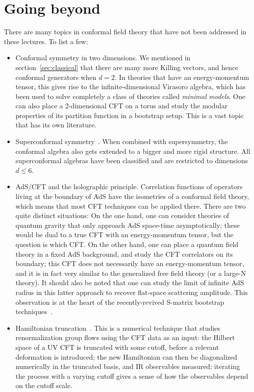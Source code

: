 \documentclass[a4paper,12pt]{article}
\numberwithin{equation}{section}
\begin{document}

\section{Going beyond}

There are many topics in conformal field theory that have not been addressed in these lectures. To list a few:
\begin{itemize}

\item
Conformal symmetry in two dimensions. 
We mentioned in section~\ref{sec:classical} that there are many more Killing vectors, and hence conformal generators when $d = 2$. In theories that have an energy-momentum tensor, this gives rise to the infinite-dimensional Virasoro algebra, which has been used to solve completely a class of theories called \emph{minimal models}. 
One can also place a 2-dimensional CFT on a torus and study the modular properties of its partition function in a bootstrap setup. This is a vast topic that has its own literature.

\item
Superconformal symmetry~\cite{Argyres:2022mnu}. When combined with supersymmetry, the conformal algebra also gets extended to a bigger and more rigid structure. All superconformal algebras have been classified and are restricted to dimensions $d \leq 6$. 

\item
AdS/CFT and the holographic principle.
Correlation functions of operators living at the boundary of AdS have the isometries of a conformal field theory, which means that most CFT techniques can be applied there. There are two quite distinct situations: On the one hand, one can consider theories of quantum gravity that only approach AdS space-time asymptotically; these would be dual to a true CFT with an energy-momentum tensor, but the question is which CFT. 
On the other hand, one can place a quantum field theory in a fixed AdS background, and study the CFT correlators on its boundary; this CFT does not necessarily have an energy-momentum tensor, and it is in fact very similar to the generalized free field theory (or a large-N theory).
It should also be noted that one can study the limit of infinite AdS radius in this latter approach to recover flat-space scattering amplitude. This observation is at the heart of the recently-revived S-matrix bootstrap techniques~\cite{Kruczenski:2022lot}.

\item
Hamiltonian truncation~\cite{Fitzpatrick:2022dwq}.
This is a numerical technique that studies renormalization group flows using the CFT data as an input: the Hilbert space of a UV CFT is truncated with some cutoff, before a relevant deformation is introduced; the new Hamiltonian can then be diagonalized numerically in the truncated basis, and IR observables measured; iterating the process with a varying cutoff gives a sense of how the observables depend on the cutoff scale. 
 
\end{itemize}
\end{document}
